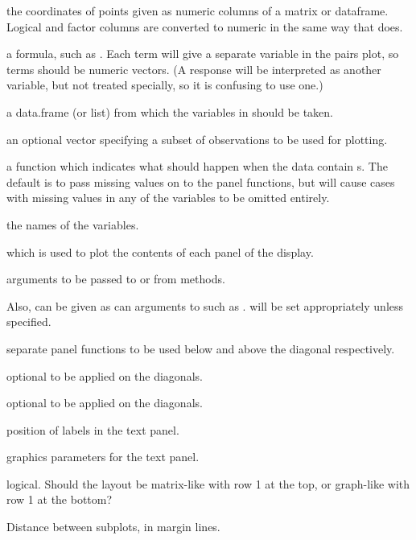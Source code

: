 \begin{Arguments}
\begin{ldescription}
\item[\code{x}] the coordinates of points given as numeric columns of a 
matrix or dataframe.  Logical and factor columns are converted to
numeric in the same way that  does.

\item[\code{formula}] a formula, such as .  Each term will
give a separate variable in the pairs plot, so terms should be
numeric vectors.  (A response will be interpreted as another
variable, but not treated specially, so it is confusing to use one.)
\item[\code{data}] a data.frame (or list) from which the variables in
 should be taken.
\item[\code{subset}] an optional vector specifying a subset of observations
to be used for plotting.
\item[\code{na.action}] a function which indicates what should happen
when the data contain s.  The default is to pass missing
values on to the panel functions, but 
will cause cases with missing values in any of the variables to be
omitted entirely.
\item[\code{labels}] the names of the variables.
\item[\code{panel}]  which is used to plot
the contents of each panel of the display.
\item[\code{...}] 
arguments to be passed to or from methods.

Also,  can be given as can arguments to
 such as .   will be set
appropriately unless specified.

\item[\code{lower.panel, upper.panel}] separate panel functions to be used
below and above the diagonal respectively.
\item[\code{diag.panel}] optional  to be
applied on the diagonals.
\item[\code{text.panel}] optional  to be applied on the diagonals.
\item[\code{label.pos}]  position of labels in the text panel.
\item[\code{cex.labels, font.labels}] graphics parameters for the text panel.
\item[\code{row1attop}] logical. Should the layout be matrix-like with row 1
at the top, or graph-like with row 1 at the bottom?
\item[\code{gap}] Distance between subplots, in margin lines.
\end{ldescription}
\end{Arguments}
